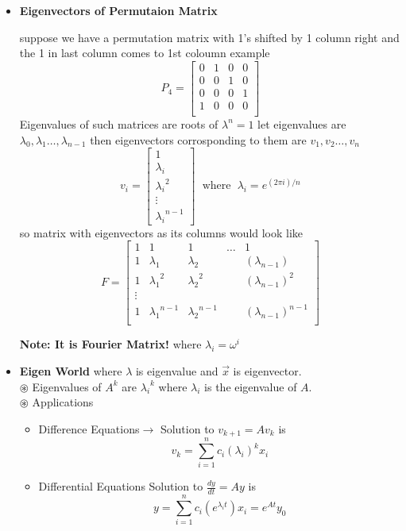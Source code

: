 \documentclass[a4paper]{article}
\numberwithin{equation}{section}
\begin{document}
\begin{itemize}
\item \textbf{Eigenvectors of Permutaion Matrix}

suppose we have a permutation matrix with 1's shifted by 1 column right and the 1 in last column comes to 1st coloumn example
\[P_4=\begin{bmatrix}
    0&1&0&0\\
    0&0&1&0\\
    0&0&0&1\\
    1&0&0&0\\
\end{bmatrix}\]
Eigenvalues of such matrices are roots of $\lambda^n=1$ let eigenvalues are $\lambda_0,\lambda_1\dots,\lambda_{n-1}$ then eigenvectors corrosponding to them are $v_1,v_2\dots,v_n$
\[v_i=\begin{bmatrix}
    1\\\lambda_i \\ {\lambda_i}^2 \\ \vdots \\{\lambda_i}^{n-1}
\end{bmatrix} \hspace{7pt} \text{where} \hspace{7pt} \lambda_i=e^{{(2\pi i)}/{n}} \]
so matrix with eigenvectors as its columns would look like
\[F=\begin{bmatrix}
    1&1&1&\dots&1\\
    1&{\lambda_1}&{\lambda_2}&&{(\lambda_{n-1})}\\
    1&{\lambda_1}^2&{\lambda_2}^2&&{(\lambda_{n-1})}^2\\
    \vdots&\\
    1&{\lambda_1}^{n-1}&{\lambda_2}^{n-1}&&{(\lambda_{n-1})}^{n-1}\\
\end{bmatrix}\]

\textbf{Note: It is Fourier Matrix!} where $\lambda_i=\omega^i$

\item \textbf{Eigen World}  where $\lambda$ is eigenvalue and $\vec{x}$ is eigenvector.\\

$\circledast$ Eigenvalues of $A^k$ are ${\lambda_i}^k$ where $\lambda_i$ is the eigenvalue of $A$.\\
$\circledast$ Applications
\begin{itemize}
    \item Difference Equations$\rightarrow$ Solution to $v_{k+1}=Av_{k}$ is \[v_k=\sum_{i=1}^{n}c_i{(\lambda_i)}^kx_i\]
    \item Differential Equations Solution to $\frac{dy}{dt}=Ay$ is \[y=\sum_{i=1}^{n}c_i{(e^{\lambda_i t})}x_i=e^{At}y_0\]
\end{itemize}


\end{itemize}
\end{document}
